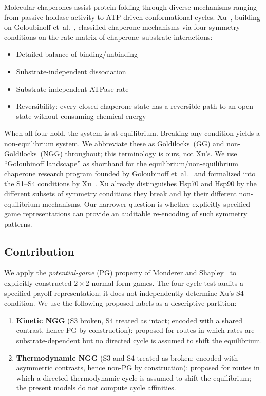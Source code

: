 \documentclass[12pt,a4paper]{article}
\begin{document}
Molecular chaperones assist protein folding through diverse mechanisms
ranging from passive holdase activity to ATP-driven conformational cycles.
Xu~\cite{Xu2022}, building on Goloubinoff et~al.~\cite{Goloubinoff2018},
classified chaperone mechanisms via four symmetry conditions on the rate
matrix of chaperone--substrate interactions:
\begin{itemize}
  \item[\textbf{S1}] Detailed balance of binding/unbinding
  \item[\textbf{S2}] Substrate-independent dissociation
  \item[\textbf{S3}] Substrate-independent ATPase rate
  \item[\textbf{S4}] Reversibility: every closed chaperone state has a
    reversible path to an open state without consuming chemical energy
\end{itemize}
When all four hold, the system is at equilibrium.
Breaking any condition yields a non-equilibrium
system. We abbreviate these as Goldilocks~(GG) and
non-Goldilocks~(NGG) throughout; this terminology is ours, not Xu's.
We use ``Goloubinoff landscape'' as shorthand for the
equilibrium/non-equilibrium chaperone research program founded by
Goloubinoff et~al.~\cite{Goloubinoff2018} and formalized into the
S1--S4 conditions by Xu~\cite{Xu2022}.
Xu already distinguishes Hsp70 and Hsp90 by the different subsets of
symmetry conditions they break and by their different non-equilibrium
mechanisms. Our narrower question is whether explicitly specified game
representations can provide an auditable re-encoding of such symmetry
patterns.

\subsection{Contribution}

We apply the \emph{potential-game} (PG) property of Monderer and
Shapley~\cite{MondererShapley1996} to explicitly constructed
$2\times 2$ normal-form games. The four-cycle test audits a specified
payoff representation; it does not independently determine Xu's S4
condition. We use the following proposed labels as a descriptive
partition:
\begin{enumerate}
  \item \textbf{Kinetic NGG} (S3 broken, S4 treated as intact; encoded
    with a shared contrast, hence PG by construction): proposed for routes
    in which rates are substrate-dependent but no directed cycle is
    assumed to shift the equilibrium.
  \item \textbf{Thermodynamic NGG} (S3 and S4 treated as broken; encoded
    with asymmetric contrasts, hence non-PG by construction): proposed for
    routes in which a directed thermodynamic cycle is assumed to shift the
    equilibrium; the present models do not compute cycle affinities.
\end{enumerate}
\end{document}

